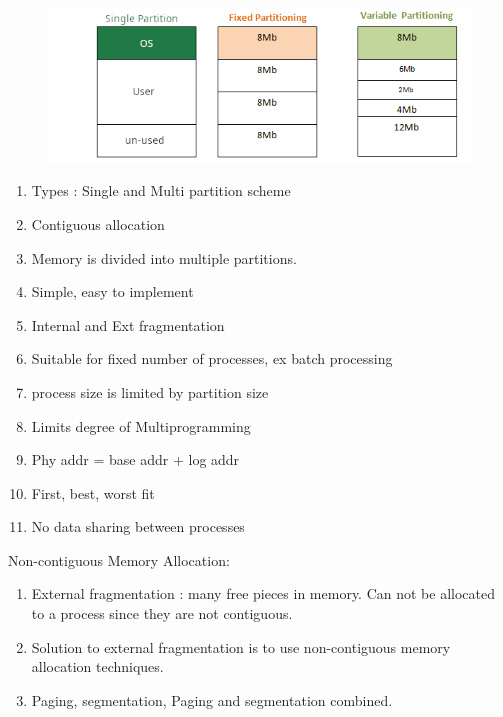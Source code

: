 \begin{enumerate}
  \begin{figure}[h]
      \centering   \includegraphics[scale=3]{./images/contigious_partition_01.jpeg}
  \end{figure}

  \begin{enumerate}
    \item Types : Single and Multi partition scheme
    \item Contiguous allocation
    \item Memory is divided into multiple partitions.
    \item Simple, easy to implement
    \item Internal and Ext fragmentation
    \item Suitable for fixed number of processes, ex batch processing
    \item process size is limited by partition size
    \item Limits degree of Multiprogramming
    \item Phy addr = base addr + log addr
    \item First, best, worst fit
    \item No data sharing between processes
  \end{enumerate}

  \begin{minipage}{\linewidth}
    \item Non-contiguous Memory Allocation:
    \begin{enumerate}
      \item External fragmentation : many free pieces in memory. Can not be allocated to a process since they are not contiguous.
      \item Solution to external fragmentation is to use non-contiguous memory allocation techniques.
      \item Paging, segmentation, Paging and segmentation combined.
    \end{enumerate}
  \end{minipage}


\end{enumerate}
